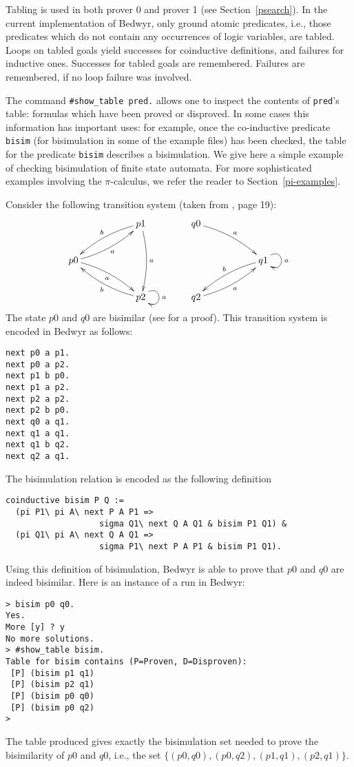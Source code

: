 \documentclass{article}
\begin{document}
Tabling is used in both prover 0 and prover 1 (see Section~\ref{psearch}).
In the current implementation of Bedwyr, only ground atomic predicates, i.e.,
those predicates which do not contain any occurrences of logic variables, 
are tabled. 
Loops on tabled goals yield successes for coinductive definitions,
and failures for inductive ones.
Successes for tabled goals are remembered.
Failures are remembered, if no loop failure was involved.

The command \verb/#show_table pred./ allows one to inspect the
contents of \verb.pred.'s table: formulas which have been proved or
disproved.  In some cases this information has important uses: for
example, once the co-inductive predicate {\tt bisim} (for bisimulation
in some of the example files) has been checked, the table for the
predicate {\tt bisim} describes a bisimulation.  
We give here a simple example of checking bisimulation of finite
state automata. For more sophisticated examples involving the $\pi$-calculus,
we refer the reader to Section~\ref{pi-examples}.

Consider the following transition system (taken from \cite{milner99book}, 
page 19):
$$
\xymatrix{
   &  & p1 \ar@/_/[lld]_b \ar@/^/[dd]^a \\
p0 \ar@/_/[rru]_a \ar@/^/[rrd]_a \\
 & & p2 \ar@(ur,dr)^a \ar@/^/[llu]^b
}
\qquad
\xymatrix{
q0 \ar@/^/[rrd]^a \\
 & & q1 \ar@(ur,dr)^a \ar@/_/[dll]_b \\
q2 \ar@/_/[rru]_a
}
$$
The state $p0$ and $q0$ are bisimilar (see \cite{milner99book} for a proof).
This transition system is encoded in Bedwyr as follows:
\begin{verbatim}
next p0 a p1.
next p0 a p2.
next p1 b p0.
next p1 a p2.
next p2 a p2.
next p2 b p0.
next q0 a q1.
next q1 a q1.
next q1 b q2.
next q2 a q1.
\end{verbatim}
The bisimulation relation is encoded as the following definition
\begin{verbatim}
coinductive bisim P Q := 
  (pi P1\ pi A\ next P A P1 => 
                   sigma Q1\ next Q A Q1 & bisim P1 Q1) &
  (pi Q1\ pi A\ next Q A Q1 => 
                   sigma P1\ next P A P1 & bisim P1 Q1).
\end{verbatim}
Using this definition of bisimulation, Bedwyr is able to prove that
$p0$ and $q0$ are indeed bisimilar. Here is an instance of a run in Bedwyr:
\begin{verbatim}
> bisim p0 q0.
Yes.
More [y] ? y
No more solutions.
> #show_table bisim.
Table for bisim contains (P=Proven, D=Disproven):
 [P] (bisim p1 q1)
 [P] (bisim p2 q1)
 [P] (bisim p0 q0)
 [P] (bisim p0 q2)
> 
\end{verbatim}
The table produced gives exactly the bisimulation set
needed to prove the bisimilarity of $p0$ and $q0$, i.e.,
the set $\{(p0,q0), (p0, q2), (p1,q1), (p2,q1) \}.$
\end{document}
